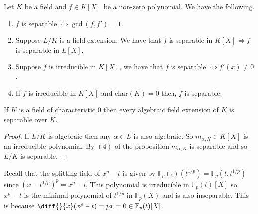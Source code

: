 \documentclass[12pt, a4paper]{article}
\begin{document}
\begin{mdprop}
    Let \(K\) be a field and \(f\in K[X]\) be a non-zero polynomial. We have the following.
    \begin{enumerate}
        \item \(f\) is separable \(\iff \gcd(f,f')=1\).
        \item Suppose \(L/K\) is a field extension. We have that \(f\) is separable in \(K[X] \iff f\) is separable in \(L[X]\).
        \item Suppose \(f\) is irreducible in \(K[X]\), we have that \(f\) is separable \(\iff f'(x)\neq 0\).
        \item If \(f\) is irreducible in \(K[X]\) and \(\text{char}(K)=0\) then, \(f\) is separable.
    \end{enumerate}
\end{mdprop}

\begin{mdcor}
    If \(K\) is a field of characteristic \(0\) then every algebraic field extension of \(K\) is separable over \(K\).
\end{mdcor}

\begin{proof}
    If \(L/K\) is algebraic then any \(\alpha\in L\) is also algebraic. So \(m_{\alpha,K}\in K[X]\) is an irreducible polynomial. By \((4)\) of the proposition \(m_{\alpha,K}\) is separable and so \(L/K\) is separable.
\end{proof}

\begin{mdexample}[IMPORTANT]
    Recall that the splitting field of \(x^p-t\) is given by \(\mathbb{F}_p(t)(t^{1/p})=\mathbb{F}_p(t,t^{1/p})\) since \((x-t^{1/p})^p=x^p-t\). This polynomial is irreducible in \(\mathbb{F}_p(t)[X]\) so \(x^p-t\) is the minimal polynomial of \(t^{1/p}\) in \(\mathbb{F}_p(X)\) and is also inseparable. This is because \(\diff{}{x}(x^p-t) = px = 0 \in \mathbb{F}_p(t)[X]\).
\end{mdexample}
\end{document}
